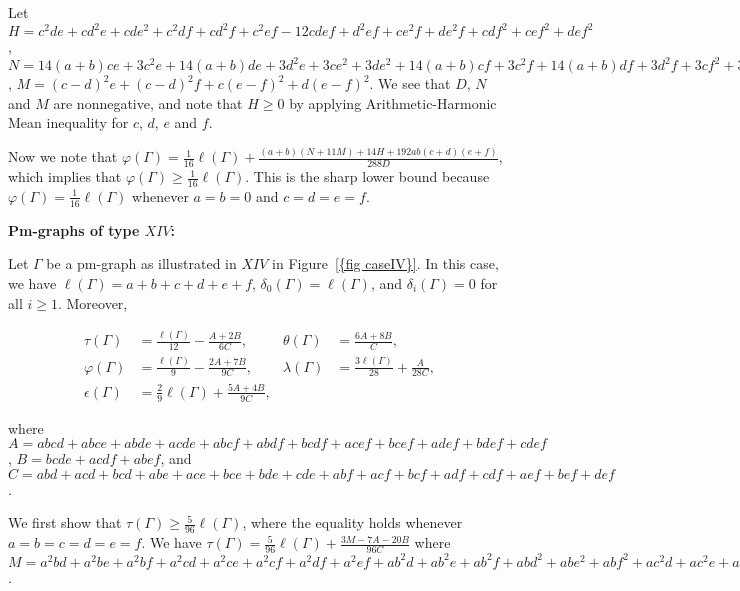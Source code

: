 \documentclass[12pt]{amsart}
\theoremstyle{example}
\theoremstyle{definition}
\theoremstyle{notation}
\begin{document}
Let $H=c^2 d e+c d^2 e+c d e^2+c^2 d f+c d^2 f+c^2 e f-12 c d e f+d^2 e f+c e^2 f+d e^2 f+c d f^2+c e f^2+d e f^2$,
$N=14 (a + b) c e + 3 c^2 e + 14 (a + b) d e + 3 d^2 e + 3 c e^2 +
 3 d e^2 + 14 (a + b) c f + 3 c^2 f + 14 (a + b) d f + 3 d^2 f +
 3 c f^2 + 3 d f^2$, $M=(c - d)^2 e + (c - d)^2 f + c (e - f)^2 + d (e - f)^2$. We see that $D$, $N$ and $M$ are nonnegative, and
note that $H \geq 0$ by applying Arithmetic-Harmonic Mean inequality for $c$, $d$, $e$ and $f$.

Now we note that
${\varphi ({\Gamma})}=\frac{1}{16}{\ell ({\Gamma})}+\frac{(a+b)(N+11 M)+14 H+192 a b (c + d) (e + f)}{288 D}$, which implies that ${\varphi ({\Gamma})} \geq \frac{1}{16}{\ell ({\Gamma})}$. This is the sharp lower bound because
${\varphi ({\Gamma})} = \frac{1}{16}{\ell ({\Gamma})}$ whenever $a=b=0$ and $c=d=e=f$.

\textbf{Pm-graphs of type $XIV$:}

Let ${\Gamma}$ be a pm-graph as illustrated in $XIV$ in {Figure~\ref{{fig caseIV}}}. In this case, we have
${\ell ({\Gamma})}=a+b+c+d+e+f$, $\delta_0({\Gamma})={\ell ({\Gamma})}$, and $\delta_i({\Gamma})=0$ for all $i \geq 1$. Moreover,

\begin{align*}
{\tau(\Gamma)}&=\frac{\ell ({\Gamma})}{12}-\frac{A+2B}{6 C},&
{\theta ({\Gamma})}&=\frac{6A+8B}{C}, \\
{\varphi ({\Gamma})}&=\frac{\ell ({\Gamma})}{9}-\frac{2A+7B}{9 C},&
{\lambda ({\Gamma})}&=\frac{3{\ell ({\Gamma})}}{28}+\frac{A}{28 C},
\\  {\epsilon({\Gamma})} &=\frac{2}{9}{\ell ({\Gamma})}+\frac{5A+4B}{9 C}, &  &
\end{align*}

where $A=a b c d + a b c e + a b d e + a c d e + a b c f + a b d f + b c d f +
 a c e f + b c e f + a d e f + b d e f + c d e f$, $B=b c d e + a c d f + a b e f$, and
$C=a b d + a c d + b c d + a b e + a c e + b c e + b d e + c d e +
 a b f + a c f + b c f + a d f + c d f + a e f + b e f + d e f$.

We first show that  ${\tau(\Gamma)} \geq \frac{5}{96} {\ell ({\Gamma})} $, where the equality holds whenever $a=b=c=d=e=f$.
We have ${\tau(\Gamma)}=\frac{5}{96} {\ell ({\Gamma})} + \frac{3M-7A-20B}{96 C}$
where
$M=a^2 b d+a^2 b e+a^2 b f+a^2 c d+a^2 c e+a^2 c f+a^2 d f+a^2 e f+a b^2 d+a b^2 e+a b^2 f+a b d^2+a b e^2+a b f^2+a c^2 d+a c^2 e+a c^2 f+a c d^2+a c e^2+a c f^2+a d^2 f+a d f^2+a e^2 f+a e f^2+b^2 c d+b^2 c e+b^2 c f+b^2 d e+b^2 e f+b c^2 d+b c^2 e+b c^2 f+b c d^2+b c e^2+b c f^2+b d^2 e+b d e^2+b e^2 f+b e f^2+c^2 d e+c^2 d f+c d^2 e+c d^2 f+c d e^2+c d f^2+d^2 e f+d e^2 f+d e f^2$.
\end{document}
